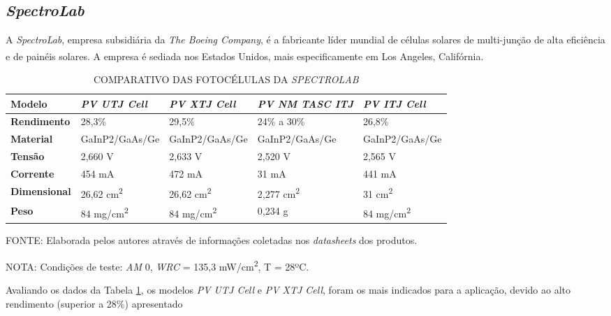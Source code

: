 \documentclass[
	12pt,				%
	openright,			%
	oneside,			%
	a4paper,			%
	english,			%
	french,				%
	spanish,			%
	brazil,				%
	oldfontcommands
	]{abntex2}
\begin{document}
\subsection[SpectroLab]{\textit{SpectroLab}}
	
	A \textit{SpectroLab}, empresa subsidiária da \textit{The Boeing Company}, é a fabricante líder mundial de células solares de multi-junção de alta eficiência e de painéis solares. A empresa é sediada nos Estados Unidos, mais especificamente em Los Angeles, Califórnia.\textsuperscript{\cite{SpectroLab}}
	
	\begin{table}[th]
	\caption{COMPARATIVO DAS FOTOCÉLULAS DA \textit{SPECTROLAB}}
	\label{Tab_Spectro_Comp}
	\begin{tabular}{p{2.5cm}|p{3.1cm}|p{3.1cm}|p{3.1cm}|p{3.1cm}}
		\textbf{Modelo} & \textit{\textbf{PV UTJ Cell}} & \textit{\textbf{PV XTJ Cell}} & \textit{\textbf{PV NM TASC ITJ}} & \textit{\textbf{PV ITJ Cell}} \\
		\hline
		\textbf{Rendimento} & 28,3\% & 29,5\% & 24\% a 30\% & 26,8\% \\
		\hline
		\textbf{Material} & GaInP2/GaAs/Ge & GaInP2/GaAs/Ge & GaInP2/GaAs/Ge & GaInP2/GaAs/Ge\\
		\hline
		\textbf{Tensão} & 2,660 V & 2,633 V & 2,520 V & 2,565 V\\
		\hline
		\textbf{Corrente} & 454 mA & 472 mA & 31 mA & 441 mA\\
		\hline
		\textbf{Dimensional} & 26,62 cm\textsuperscript{2} & 26,62 cm\textsuperscript{2} & 2,277 cm\textsuperscript{2} & 31 cm\textsuperscript{2}\\
		\hline
		\textbf{Peso} & 84 mg/cm\textsuperscript{2} & 84 mg/cm\textsuperscript{2} & 0,234 g & 84 mg/cm\textsuperscript{2}\\
	\end{tabular}
	
	\begin{small}
	\vspace{3pt}
		FONTE: Elaborada pelos autores através de informações coletadas nos \textit{datasheets} dos produtos.
	\end{small}
	\begin{footnotesize}
		NOTA: Condições de teste: \textit{AM} 0, \textit{WRC} = 135,3 mW/cm\textsuperscript{2}, T = 28ºC.
	\end{footnotesize}
	\end{table}

	Avaliando os dados da Tabela \ref{Tab_Spectro_Comp}, os modelos \textit{PV UTJ Cell} e \textit{PV XTJ Cell}, foram os mais indicados para a aplicação, devido ao alto rendimento (superior a 28\%) apresentado
	
\end{document}
